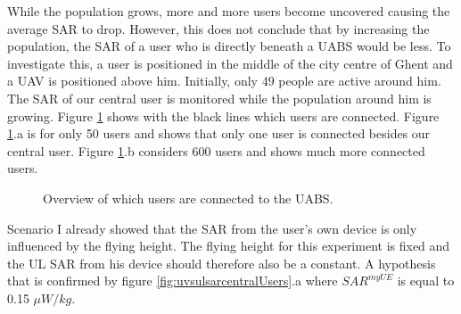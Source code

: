 While the population grows, more and more users become uncovered causing the average SAR to drop. 
However, this does not conclude that  by increasing the population, the SAR of a user who is directly beneath a \gls{UABS} would be less.
To investigate this, a user is positioned in the middle of the city centre of Ghent and a \gls{UAV} is positioned above him. Initially, only 
49 people are active around him. The \gls{SAR} of our central user is monitored while the population around him is growing.
Figure \ref{fig:connectionMap} shows with the black lines which users are connected. Figure \ref{fig:connectionMap}.a is for only 50 users and 
shows that only one user is connected besides our central user. Figure \ref{fig:connectionMap}.b considers 600 users and shows much more connected users.
\begin{figure}[h]
\hfill
{}
\caption{Overview of which users are connected to the \acs{UABS}.}
  \label{fig:connectionMap}
\end{figure}
Scenario I already showed that the \gls{SAR} from the user's own device is only influenced by the flying height. 
The flying height for this experiment is fixed and the \gls{UL} \gls{SAR} from his device should therefore also be a constant. 
A hypothesis that is confirmed by figure \ref{fig:uvsulsarcentralUsers}.a where $SAR^{myUE}$ is equal to 0.15 $\mu W/kg$.
